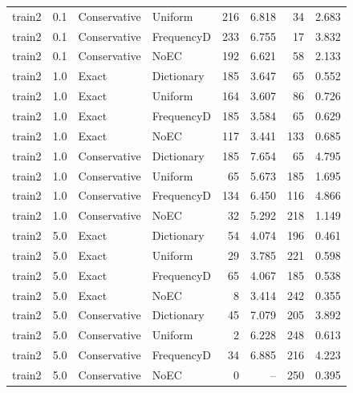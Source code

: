 \begin{longtable}{@{}lrllrrrr@{}}
train2 & 0.1 & Conservative & Uniform & 216 & 6.818 & 34 & 2.683\\
train2 & 0.1 & Conservative & FrequencyD & 233 & 6.755 & 17 & 3.832\\
train2 & 0.1 & Conservative & NoEC & 192 & 6.621 & 58 & 2.133\\
train2 & 1.0 & Exact & Dictionary & 185 & 3.647 & 65 & 0.552\\
train2 & 1.0 & Exact & Uniform & 164 & 3.607 & 86 & 0.726\\
train2 & 1.0 & Exact & FrequencyD & 185 & 3.584 & 65 & 0.629\\
train2 & 1.0 & Exact & NoEC & 117 & 3.441 & 133 & 0.685\\
train2 & 1.0 & Conservative & Dictionary & 185 & 7.654 & 65 & 4.795\\
train2 & 1.0 & Conservative & Uniform & 65 & 5.673 & 185 & 1.695\\
train2 & 1.0 & Conservative & FrequencyD & 134 & 6.450 & 116 & 4.866\\
train2 & 1.0 & Conservative & NoEC & 32 & 5.292 & 218 & 1.149\\
train2 & 5.0 & Exact & Dictionary & 54 & 4.074 & 196 & 0.461\\
train2 & 5.0 & Exact & Uniform & 29 & 3.785 & 221 & 0.598\\
train2 & 5.0 & Exact & FrequencyD & 65 & 4.067 & 185 & 0.538\\
train2 & 5.0 & Exact & NoEC & 8 & 3.414 & 242 & 0.355\\
train2 & 5.0 & Conservative & Dictionary & 45 & 7.079 & 205 & 3.892\\
train2 & 5.0 & Conservative & Uniform & 2 & 6.228 & 248 & 0.613\\
train2 & 5.0 & Conservative & FrequencyD & 34 & 6.885 & 216 & 4.223\\
train2 & 5.0 & Conservative & NoEC & 0 & -- & 250 & 0.395\\
\end{longtable}
\endgroup
